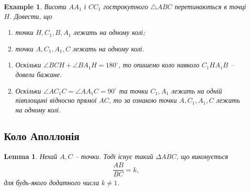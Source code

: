 \documentclass[a4paper, 10pt]{article}
\theoremstyle{theoremdd}
\theoremstyle{theoremdd}
\theoremstyle{theoremdd}
\theoremstyle{theoremdd}
\theoremstyle{theoremdd}
\newtheorem{example}[theorem]{Example}
\theoremstyle{theoremdd}
\theoremstyle{theoremdd}
\theoremstyle{theoremdd}
\newtheorem{lemma}[theorem]{Lemma}
\theoremstyle{theoremdd}
\begin{document}
\begin{example}
Висоти $AA_1$ і $CC_1$ гострокутного $\triangle ABC$ перетинаються в точці $H$. Довести, що
\begin{enumerate}[nosep,wide=0pt,label={\arabic*)}]
\item точки $H,C_1,B,A_1$ лежать на одному колі;
\item точки $A,C_1,A_1,C$ лежать на одному колі. \\
\end{enumerate}
\begin{enumerate}[nosep,wide=0pt,label={\arabic*)}]
\item Оскільки $\angle BCH + \angle BA_1H = 180^\circ$, то опишемо коло навколо $C_1HA_1B$ -- довели бажане.
\item Оскільки $\angle AC_1C = \angle AA_1 C = 90^\circ$ та точки $C_1,A_1$ лежать на одній півплощині відносно прямої $AC$, то за ознакою точки $A,C_1,A_1,C$ лежать на одному колі. 
\end{enumerate}
\begin{figure}[H]
\centering
{}
\end{figure}
\end{example}

\subsection{Коло Аполлонія}
\begin{lemma}
Нехай $A,C$ -- точки. Тоді існує такий $\Delta ABC$, що виконується
\begin{align*}
\dfrac{AB}{BC} = k,
\end{align*}
для будь-якого додатного числа $k \neq 1$.
\end{lemma}
\end{document}
